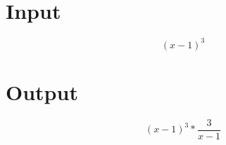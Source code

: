 \documentclass[a4paper, 12pt]{article}
\begin{document}
\Large
\section{Input}

\[(x - 1 )^ 3 \]
\section{Output}

\[(x - 1 )^ 3 * \frac{3 }{x - 1 }\]
\end{document}
